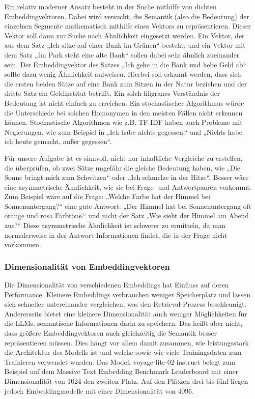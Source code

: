 Ein relativ moderner Ansatz besteht in der Suche mithilfe von dichten Embeddingvektoren.
Dabei wird versucht, die Semantik (also die Bedeutung) der einzelnen Segmente mathematisch mithilfe eines Vektors zu repräsentieren.
Dieser Vektor soll dann zur Suche nach Ähnlichkeit eingesetzt werden.
Ein Vektor, der aus dem Satz „Ich sitze auf einer Bank im Grünen“ besteht, und ein Vektor mit dem Satz „Im Park steht eine alte Bank“ sollen dabei sehr ähnlich zueinander sein.
Der Embeddingvektor des Satzes „Ich gehe in die Bank und hebe Geld ab“ sollte dazu wenig Ähnlichkeit aufweisen.
Hierbei soll erkannt werden, dass sich die ersten beiden Sätze auf eine Bank zum Sitzen in der Natur beziehen und der dritte Satz ein Geldinstitut betrifft.
Ein solch filigranes Verständnis der Bedeutung ist nicht einfach zu erreichen.
Ein stochastischer Algorithmus würde die Unterschiede bei solchen Homonymen in den meisten Fällen nicht erkennen können. 
Stochastische Algorithmen wie z.B. TF-IDF haben auch Probleme mit Negierungen, wie zum Beispiel in „Ich habe nichts gegessen.“ und „Nichts habe ich heute gemacht, außer gegessen“.

Für unsere Aufgabe ist es sinnvoll, nicht nur inhaltliche Vergleiche zu erstellen, die überprüfen, ob zwei Sätze ungefähr die gleiche Bedeutung haben, wie „Die Sonne bringt mich zum Schwitzen“ oder „Ich schmelze in der Hitze“.
Besser wäre eine asymmetrische Ähnlichkeit, wie sie bei Frage- und Antwortpaaren vorkommt.
Zum Beispiel wäre auf die Frage: „Welche Farbe hat der Himmel bei Sonnenuntergang?“ eine gute Antwort: „Der Himmel hat bei Sonnenuntergang oft orange und rosa Farbtöne.“ und nicht der Satz „Wie sieht der Himmel am Abend aus?“
Diese asymmetrische Ähnlichkeit ist schwerer zu ermitteln, da man normalerweise in der Antwort Informationen findet, die in der Frage nicht vorkommen.

\subsubsection{Dimensionalität von Embeddingvektoren}

Die Dimensionalität von verschiedenen Embeddings hat Einfluss auf deren Performance.
Kleinere Embeddings verbrauchen weniger Speicherplatz und lassen sich schneller untereinander vergleichen, was den Retrieval-Prozess beschleunigt.
Andererseits bietet eine kleinere Dimensionalität auch weniger Möglichkeiten für die LLMs, semantische Informationen darin zu speichern.
Das heißt aber nicht, dass größere Embeddingvektoren auch gleichzeitig die Semantik besser repräsentieren müssen.
Dies hängt vor allem damit zusammen, wie leistungsstark die Architektur des Modells ist und welche sowie wie viele Trainingsdaten zum Trainieren verwendet wurden.
Das Modell voyage-lite-02-instruct belegt zum Beispiel auf dem Massive Text Embedding Benchmark Leaderboard mit einer Dimensionalität von 1024 den zweiten Platz.
Auf den Plätzen drei bis fünf liegen jedoch Embeddingmodelle mit einer Dimensionalität von 4096.

